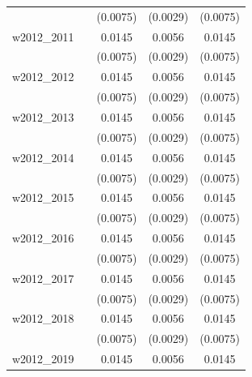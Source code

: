 \begin{table}[htbp]
\begin{tabular}{l*{4}{c}}
            &                     &    (0.0075)         &    (0.0029)         &    (0.0075)         \\
[1em]
w2012\_2011  &                     &      0.0145\sym{*}  &      0.0056\sym{*}  &      0.0145\sym{*}  \\
            &                     &    (0.0075)         &    (0.0029)         &    (0.0075)         \\
[1em]
w2012\_2012  &                     &      0.0145\sym{*}  &      0.0056\sym{*}  &      0.0145\sym{*}  \\
            &                     &    (0.0075)         &    (0.0029)         &    (0.0075)         \\
[1em]
w2012\_2013  &                     &      0.0145\sym{*}  &      0.0056\sym{*}  &      0.0145\sym{*}  \\
            &                     &    (0.0075)         &    (0.0029)         &    (0.0075)         \\
[1em]
w2012\_2014  &                     &      0.0145\sym{*}  &      0.0056\sym{*}  &      0.0145\sym{*}  \\
            &                     &    (0.0075)         &    (0.0029)         &    (0.0075)         \\
[1em]
w2012\_2015  &                     &      0.0145\sym{*}  &      0.0056\sym{*}  &      0.0145\sym{*}  \\
            &                     &    (0.0075)         &    (0.0029)         &    (0.0075)         \\
[1em]
w2012\_2016  &                     &      0.0145\sym{*}  &      0.0056\sym{*}  &      0.0145\sym{*}  \\
            &                     &    (0.0075)         &    (0.0029)         &    (0.0075)         \\
[1em]
w2012\_2017  &                     &      0.0145\sym{*}  &      0.0056\sym{*}  &      0.0145\sym{*}  \\
            &                     &    (0.0075)         &    (0.0029)         &    (0.0075)         \\
[1em]
w2012\_2018  &                     &      0.0145\sym{*}  &      0.0056\sym{*}  &      0.0145\sym{*}  \\
            &                     &    (0.0075)         &    (0.0029)         &    (0.0075)         \\
[1em]
w2012\_2019  &                     &      0.0145\sym{*}  &      0.0056\sym{*}  &      0.0145\sym{*}  \\

\end{tabular}
\end{table}
